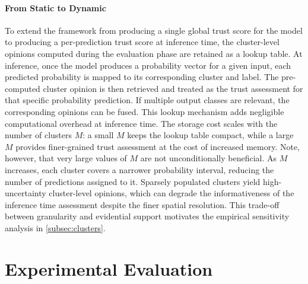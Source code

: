 \paragraph{From Static to Dynamic}
To extend the framework from producing a single global trust score for the model to producing a per-prediction trust score at inference time, the cluster-level opinions computed during the evaluation phase are retained as a lookup table. At inference, once the model produces a probability vector for a given input, each predicted probability is mapped to its corresponding cluster and label. The pre-computed cluster opinion is then retrieved and treated as the trust assessment for that specific probability prediction. If multiple output classes are relevant, the corresponding opinions can be fused. This lookup mechanism adds negligible computational overhead at inference time. The storage cost scales with the number of clusters $M$: a small $M$ keeps the lookup table compact, while a large $M$ provides finer-grained trust assessment at the cost of increased memory. Note, however, that very large values of $M$ are not unconditionally beneficial. As $M$ increases, each cluster covers a narrower probability interval, reducing the number of predictions assigned to it. Sparsely populated clusters yield high-uncertainty cluster-level opinions, which can degrade the informativeness of the inference time assessment despite the finer spatial resolution. This trade-off between granularity and evidential support motivates the empirical sensitivity analysis in \cref{subsec:clusters}.



\section{Experimental Evaluation}
\label{sec:calibration_experiments}


